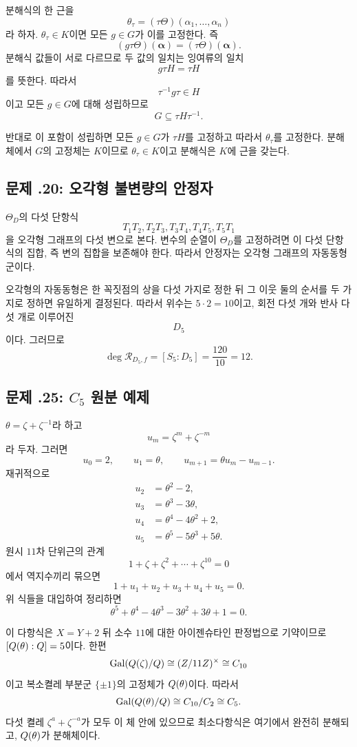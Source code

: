 \begin{solution}
분해식의 한 근을
\[
  \theta_\tau=(\tau\Theta)(\alpha_1,\dots,\alpha_n)
\]
라 하자. $\theta_\tau\in K$이면 모든 $g\in G$가 이를 고정한다. 즉
\[
  (g\tau\Theta)(\boldsymbol\alpha)
  =(\tau\Theta)(\boldsymbol\alpha).
\]
분해식 값들이 서로 다르므로 두 값의 일치는 잉여류의 일치
\[
  g\tau H=\tau H
\]
를 뜻한다. 따라서
\[
  \tau^{-1}g\tau\in H
\]
이고 모든 $g\in G$에 대해 성립하므로
\[
  G\subseteq\tau H\tau^{-1}.
\]

반대로 이 포함이 성립하면 모든 $g\in G$가 $\tau H$를 고정하고 따라서 $\theta_\tau$를 고정한다. 분해체에서 $G$의 고정체는 $K$이므로 $\theta_\tau\in K$이고 분해식은 $K$에 근을 갖는다.
\end{solution}

\subsection*{문제 \thechapter.20: 오각형 불변량의 안정자}

\begin{solution}
$\Theta_D$의 다섯 단항식
\[
  T_1T_2,T_2T_3,T_3T_4,T_4T_5,T_5T_1
\]
을 오각형 그래프의 다섯 변으로 본다. 변수의 순열이 $\Theta_D$를 고정하려면 이 다섯 단항식의 집합, 즉 변의 집합을 보존해야 한다. 따라서 안정자는 오각형 그래프의 자동동형군이다.

오각형의 자동동형은 한 꼭짓점의 상을 다섯 가지로 정한 뒤 그 이웃 둘의 순서를 두 가지로 정하면 유일하게 결정된다. 따라서 위수는 $5\cdot2=10$이고, 회전 다섯 개와 반사 다섯 개로 이루어진
\[
  D_5
\]
이다. 그러므로
\[
  \deg\mathcal R_{D_5,f}
  =[S_5:D_5]=\frac{120}{10}=12.
\]
\end{solution}

\subsection*{문제 \thechapter.25: $C_5$ 원분 예제}

\begin{solution}
$\theta=\zeta+\zeta^{-1}$라 하고
\[
  u_m=\zeta^m+\zeta^{-m}
\]
라 두자. 그러면
\[
  u_0=2,\qquad u_1=\theta,\qquad
  u_{m+1}=\theta u_m-u_{m-1}.
\]
재귀적으로
\[
\begin{aligned}
  u_2&=\theta^2-2,\\
  u_3&=\theta^3-3\theta,\\
  u_4&=\theta^4-4\theta^2+2,\\
  u_5&=\theta^5-5\theta^3+5\theta.
\end{aligned}
\]
원시 $11$차 단위근의 관계
\[
  1+\zeta+\zeta^2+\cdots+\zeta^{10}=0
\]
에서 역지수끼리 묶으면
\[
  1+u_1+u_2+u_3+u_4+u_5=0.
\]
위 식들을 대입하여 정리하면
\[
  \theta^5+\theta^4-4\theta^3-3\theta^2+3\theta+1=0.
\]

이 다항식은 $X=Y+2$ 뒤 소수 $11$에 대한 아이젠슈타인 판정법으로 기약이므로 $[Q(\theta):Q]=5$이다. 한편
\[
  \operatorname{Gal}(Q(\zeta)/Q)\cong(Z/11Z)^\times\cong C_{10}
\]
이고 복소켤레 부분군 $\{\pm1\}$의 고정체가 $Q(\theta)$이다. 따라서
\[
  \operatorname{Gal}(Q(\theta)/Q)\cong C_{10}/C_2\cong C_5.
\]
다섯 켤레 $\zeta^a+\zeta^{-a}$가 모두 이 체 안에 있으므로 최소다항식은 여기에서 완전히 분해되고, $Q(\theta)$가 분해체이다.
\end{solution}
